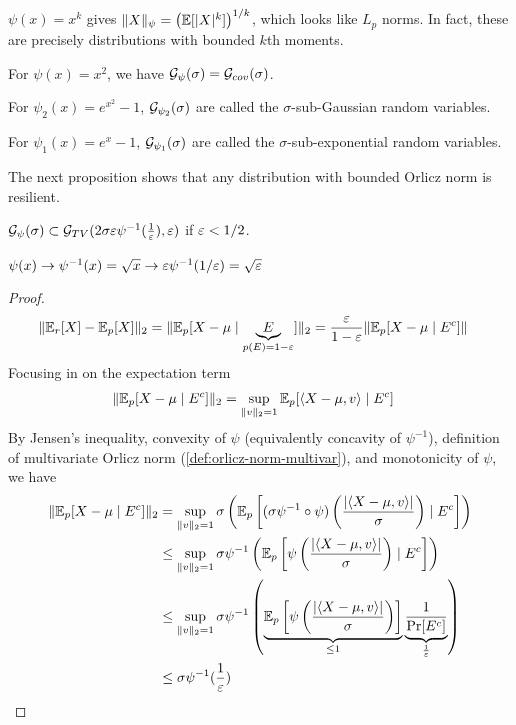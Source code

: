 \begin{example}
    $\psi(x) = x^k$ gives $\|X\|_\psi = \left(\mathbb{E}[\lvert X \rvert^k]\right)^{1/k}$,
    which looks like $L_p$ norms. In fact, these are precisely distributions with bounded $k$th moments.

    For $\psi(x) = x^2$, we have $\mathcal{G}_{\psi}(\sigma) = \mathcal{G}_{cov}(\sigma)$.
\end{example}

\begin{definition}\label{def:sub-gaussian-sub-exp-orlicz}
    For $\psi_2(x) = e^{x^2} - 1$, $\mathcal{G}_{\psi_2}(\sigma)$ are called the $\sigma$-sub-Gaussian random variables.

    For $\psi_1(x) = e^x - 1$, $\mathcal{G}_{\psi_1}(\sigma)$ are called the $\sigma$-sub-exponential random variables.
\end{definition}

The next proposition shows that any distribution with bounded Orlicz norm is resilient.
\begin{proposition}\label{lem:orlicz-norm-resilient}
    $\mathcal{G}_{\psi}(\sigma) \subset \mathcal{G}_{TV}(2 \sigma \varepsilon \psi^{-1}(\frac{1}{\varepsilon}), \varepsilon)$
    if $\varepsilon < 1/2$.

    $\psi(x) \to \psi^{-1}(x) = \sqrt{x} \to \varepsilon \psi^{-1}(1/\varepsilon) = \sqrt{\varepsilon}$
\end{proposition}

\begin{proof}
    \begin{align}
        \|\mathbb{E}_r[X] - \mathbb{E}_p[X]\|_2
        &= \|\mathbb{E}_p[X - \mu \mid \underbrace{E}_{p(E) = 1 - \varepsilon} ]\|_2
        = \frac{\varepsilon}{1 - \varepsilon} \| \mathbb{E}_p [ X- \mu \mid E^c] \|
    \end{align}
    Focusing in on the expectation term
    \begin{align}
        \| \mathbb{E}_p[X - \mu \mid E^c] \|_2
        &= \sup_{\|v\|_2 = 1} \mathbb{E}_p[\braket{X - \mu, v} \mid E^c]
    \end{align}
    By Jensen's inequality, convexity of $\psi$ (equivalently concavity of $\psi^{-1}$),
    definition of multivariate Orlicz norm (\cref{def:orlicz-norm-multivar}),
    and monotonicity of $\psi$, we have
    \begin{align}
        \| \mathbb{E}_p[X - \mu \mid E^c] \|_2
        &= \sup_{\|v\|_2 = 1} \sigma \left(
            \mathbb{E}_p\left[(\sigma \psi^{-1} \circ \psi)\left( \frac{\lvert \braket{X - \mu, v} \rvert}{\sigma} \right) \mid E^c\right]
        \right) \\
        &\leq \sup_{\|v\|_2 = 1} \sigma \psi^{-1}\left(
            \mathbb{E}_p\left[\psi\left( \frac{\lvert \braket{X - \mu, v} \rvert}{\sigma} \right) \mid E^c\right]
        \right) \\
        &\leq \sup_{\|v\|_2 = 1} \sigma \psi^{-1}\left(
            \underbrace{\mathbb{E}_p\left[\psi\left( \frac{\lvert \braket{X - \mu, v} \rvert}{\sigma} \right) \right]}_{\leq 1}
            \underbrace{\frac{1}{\Pr[E^c]}}_{\frac{1}{\varepsilon}}
        \right) \\
        &\leq \sigma \psi^{-1}(\frac{1}{\varepsilon})
    \end{align}
\end{proof}
